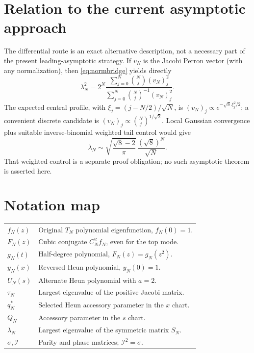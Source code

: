 \documentclass[11pt]{article}
\newcommand{\cI}{\mathcal I}
\begin{document}
\section{Relation to the current asymptotic approach}
The differential route is an exact alternative description, not a
necessary part of the present leading-asymptotic strategy. If $v_N$ is
the Jacobi Perron vector (with any normalization), then
\eqref{eq:normbridge} yields directly
\begin{equation}\label{eq:positive-ratio}
 \boxed{\lambda_N^2=2^N
 \frac{\sum_{j=0}^N\binom Nj(v_N)_j^2}
 {\sum_{j=0}^N\binom Nj^{-1}(v_N)_j^2}.}
\end{equation}
The expected central profile, with $\xi_j=(j-N/2)/\sqrt N$, is
$(v_N)_j\propto e^{-\sqrt8\,\xi_j^2/2}$; a convenient discrete
candidate is $(v_N)_j\propto\binom Nj^{1/\sqrt2}$.
Local Gaussian convergence plus suitable inverse-binomial weighted tail
control would give
\[
 \lambda_N\sim\sqrt{\frac{\sqrt8-2}{\pi}}\,
 \frac{(\sqrt8)^N}{\sqrt N}.
\]
That weighted control is a separate proof obligation; no such
asymptotic theorem is asserted here.

\section*{Notation map}
\begin{center}
\begin{tabular}{ll}
$f_N(z)$ & Original $T_N$ polynomial eigenfunction, $f_N(0)=1$.\\
$F_N(z)$ & Cubic conjugate $C_N^2f_N$, even for the top mode.\\
$g_N(t)$ & Half-degree polynomial, $F_N(z)=g_N(z^2)$.\\
$y_N(x)$ & Reversed Heun polynomial, $y_N(0)=1$.\\
$U_N(s)$ & Alternate Heun polynomial with $a=2$.\\
$\tau_N$ & Largest eigenvalue of the positive Jacobi matrix.\\
$q_N^*$ & Selected Heun accessory parameter in the $x$ chart.\\
$Q_N$ & Accessory parameter in the $s$ chart.\\
$\lambda_N$ & Largest eigenvalue of the symmetric matrix $S_N$.\\
$\sigma,\cI$ & Parity and phase matrices; $\cI^2=\sigma$.
\end{tabular}
\end{center}
\end{document}
